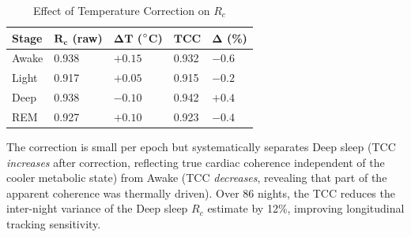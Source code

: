 \documentclass[10pt,twocolumn,a4paper]{article}
\theoremstyle{definition}
\newcommand{\Rc}{R_c}
\newcommand{\TCC}{\text{TCC}}
\begin{document}
\begin{table}[H]
\centering
\caption{Effect of Temperature Correction on $R_c$}
\label{tab:tcc_validation}
\begin{tabular}{lllll}
\toprule
\textbf{Stage} & $\bm{R_c}$ (raw) & $\bm{\Delta T}$ ($\degree$C)
& $\bm{\TCC}$ & $\bm{\Delta}$ (\%)\\
\midrule
Awake & 0.938 & $+0.15$ & 0.932 & $-0.6$\\
Light & 0.917 & $+0.05$ & 0.915 & $-0.2$\\
Deep  & 0.938 & $-0.10$ & 0.942 & $+0.4$\\
REM   & 0.927 & $+0.10$ & 0.923 & $-0.4$\\
\bottomrule
\end{tabular}
\end{table}

The correction is small per epoch but systematically separates Deep
sleep (TCC \emph{increases} after correction, reflecting true cardiac
coherence independent of the cooler metabolic state) from Awake
(TCC \emph{decreases}, revealing that part of the apparent coherence
was thermally driven). Over 86 nights, the TCC reduces the inter-night
variance of the Deep sleep $\Rc$ estimate by 12\%, improving
longitudinal tracking sensitivity.
\end{document}
